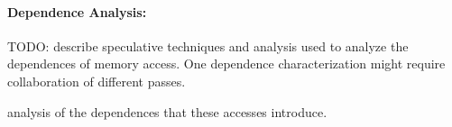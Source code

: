 

\paragraph{Dependence Analysis:}

TODO: describe speculative techniques and analysis used to analyze the
dependences of memory access.  One dependence characterization might require
collaboration of different passes.

analysis of the dependences
that these accesses introduce.




